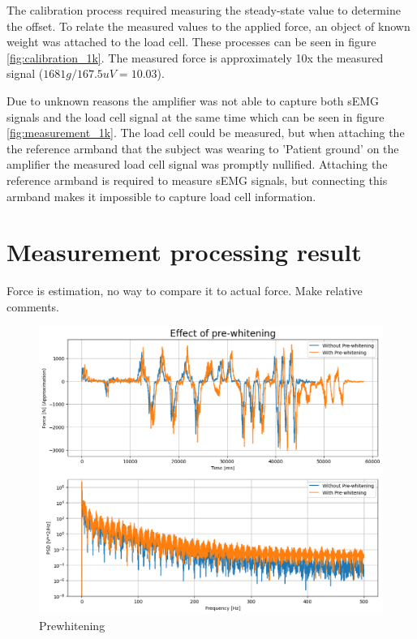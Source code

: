 The calibration process required measuring the steady-state value to determine the offset. To relate the measured values to the applied force, an object of known weight was attached to the load cell. These processes can be seen in figure \ref{fig:calibration_1k}. The measured force is approximately 10x the measured signal ($1681g / 167.5 uV = 10.03$).

Due to unknown reasons the amplifier was not able to capture both sEMG signals and the load cell signal at the same time which can be seen in figure \ref{fig:measurement_1k}. The load cell could be measured, but when attaching the the reference armband that the subject was wearing to 'Patient ground' on the amplifier the measured load cell signal was promptly nullified. Attaching the reference armband is required to measure sEMG signals, but connecting this armband makes it impossible to capture load cell information.

\section{Measurement processing result}
Force is estimation, no way to compare it to actual force. Make relative comments.

\begin{figure}[h!t]
	\begin{center}
		\includegraphics[width=0.8\columnwidth]{images/measurement_prewhitening.png}
	\end{center}
	\caption{Prewhitening}
	\label{fig:result_prewhitening}
\end{figure}


